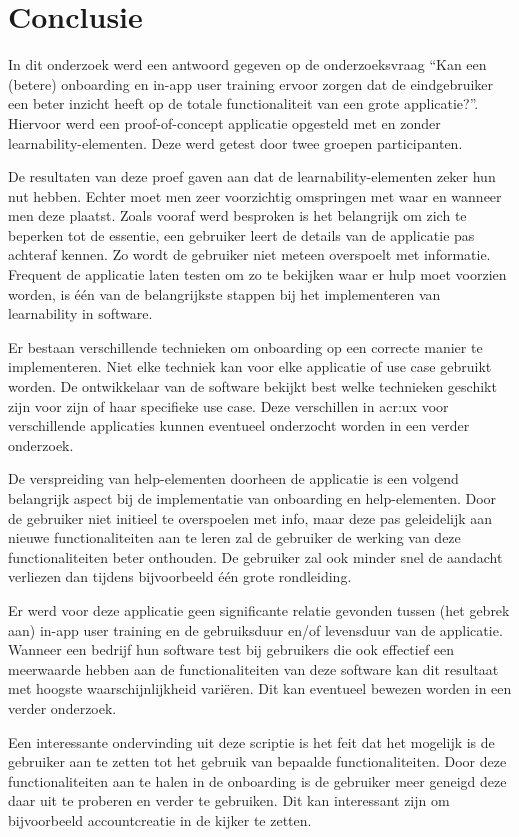 
\chapter{Conclusie}
\label{ch:conclusie}

In dit onderzoek werd een antwoord gegeven op de onderzoeksvraag ``Kan een (betere) onboarding en in-app user training ervoor zorgen dat de eindgebruiker een beter inzicht heeft op de totale functionaliteit van een grote applicatie?''. Hiervoor werd een proof-of-concept applicatie opgesteld met en zonder learnability-elementen. Deze werd getest door twee groepen participanten.

De resultaten van deze proef gaven aan dat de learnability-elementen zeker hun nut hebben. Echter moet men zeer voorzichtig omspringen met waar en wanneer men deze plaatst. Zoals vooraf werd besproken is het belangrijk om zich te beperken tot de essentie, een gebruiker leert de details van de applicatie pas achteraf kennen. Zo wordt de gebruiker niet meteen overspoelt met informatie. Frequent de applicatie laten testen om zo te bekijken waar er hulp moet voorzien worden, is één van de belangrijkste stappen bij het implementeren van learnability in software.

Er bestaan verschillende technieken om onboarding op een correcte manier te implementeren. Niet elke techniek kan voor elke applicatie of use case gebruikt worden. De ontwikkelaar van de software bekijkt best welke technieken geschikt zijn voor zijn of haar specifieke use case. Deze verschillen in \acrshort{acr:ux} voor verschillende applicaties kunnen eventueel onderzocht worden in een verder onderzoek.

De verspreiding van help-elementen doorheen de applicatie is een volgend belangrijk aspect bij de implementatie van onboarding en help-elementen. Door de gebruiker niet initieel te overspoelen met info, maar deze pas geleidelijk aan nieuwe functionaliteiten aan te leren zal de gebruiker de werking van deze functionaliteiten beter onthouden. De gebruiker zal ook minder snel de aandacht verliezen dan tijdens bijvoorbeeld één grote rondleiding.

Er werd voor deze applicatie geen significante relatie gevonden tussen (het gebrek aan) in-app user training en de gebruiksduur en/of levensduur van de applicatie. Wanneer een bedrijf hun software test bij gebruikers die ook effectief een meerwaarde hebben aan de functionaliteiten van deze software kan dit resultaat met hoogste waarschijnlijkheid variëren. Dit kan eventueel bewezen worden in een verder onderzoek.

Een interessante ondervinding uit deze scriptie is het feit dat het mogelijk is de gebruiker aan te zetten tot het gebruik van bepaalde functionaliteiten. Door deze functionaliteiten aan te halen in de onboarding is de gebruiker meer geneigd deze daar uit te proberen en verder te gebruiken. Dit kan interessant zijn om bijvoorbeeld accountcreatie in de kijker te zetten.

